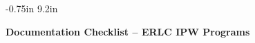  
\setlength{\topmargin} {-0.75in}
\setlength{\textheight} {9.2in}
 
%
\newcommand{\marginsize}[1]{%
  \setlength{\oddsidemargin}{#1}
  \setlength{\textwidth}{8.5in}                %
  \addtolength{\textwidth}{-2\oddsidemargin}   %
  \setlength{\marginparwidth}{.75\oddsidemargin}%
  \setlength{\marginparsep}{.1\oddsidemargin}  %
  \addtolength{\oddsidemargin}{-1in}           %
  \setlength{\evensidemargin}{\oddsidemargin}  %
}
\marginsize{1.0in}



\begin{center}
\Large\bf      Documentation Checklist -- ERLC IPW Programs
\vspace{.3in}
\end{center}
 
